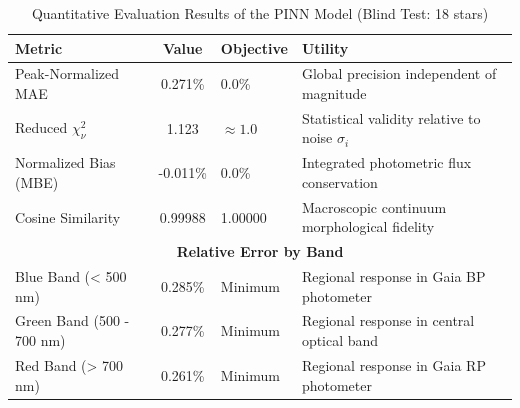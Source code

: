 
\begin{table}[htpb]
\centering
\caption{Quantitative Evaluation Results of the PINN Model (Blind Test: 18 stars)}
\label{tab:pinn_evaluation}
\begin{tabular}{lcll}
\hline
\textbf{Metric} & \textbf{Value} & \textbf{Objective} & \textbf{Utility} \\
\hline
Peak-Normalized MAE & 0.271\% & 0.0\% & Global precision independent of magnitude \\
Reduced $\chi^2_\nu$ & 1.123 & $\approx 1.0$ & Statistical validity relative to noise $\sigma_i$ \\
Normalized Bias (MBE) & -0.011\% & 0.0\% & Integrated photometric flux conservation \\
Cosine Similarity & 0.99988 & 1.00000 & Macroscopic continuum morphological fidelity \\
\hline
\multicolumn{4}{c}{\textbf{Relative Error by Band}} \\
\hline
Blue Band (< 500 nm) & 0.285\% & Minimum & Regional response in Gaia BP photometer \\
Green Band (500 - 700 nm) & 0.277\% & Minimum & Regional response in central optical band \\
Red Band (> 700 nm) & 0.261\% & Minimum & Regional response in Gaia RP photometer \\
\hline
\end{tabular}
\end{table}
